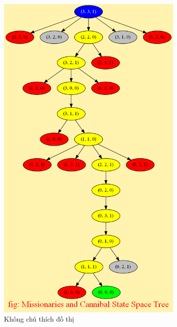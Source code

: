 \documentclass[a4paper, 11pt]{article}
\begin{document}
\begin{figure}
    \begin{subfigure}[b]{0.5\textwidth}
        \centering
        \includegraphics[width=\textwidth]{bfs.png}
        \caption{Không chú thích đồ thị}
    \end{subfigure}
    \hfill
    \begin{subfigure}[b]{0.5\textwidth}
        \centering

\end{subfigure}
\end{figure}
\end{document}
